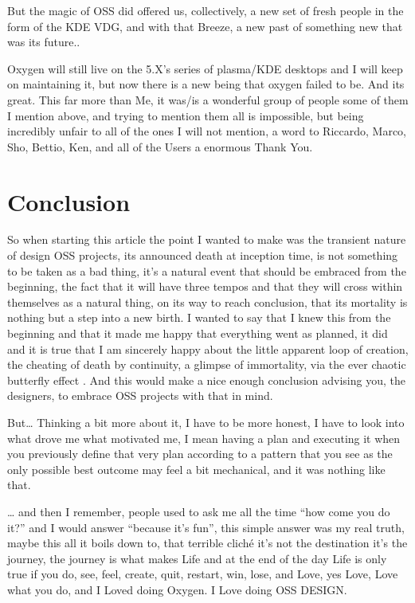 But the magic of OSS did offered us, collectively, a new set of fresh people in the form of the KDE VDG, and with that Breeze, a new past of something new that was its future..

Oxygen will still live on the 5.X's series of plasma/KDE desktops and I will keep on maintaining it, but now there is a new being that oxygen failed to be. And its great.
This far more than Me, it was/is a wonderful group of people some of them I mention above, and trying to mention them all is impossible, but being incredibly unfair to all of the ones I will not mention, a word to Riccardo, Marco, Sho, Bettio, Ken, and all of the Users a enormous Thank You. 

\section*{Conclusion}
So when starting this article the point I wanted to make was the transient nature of design OSS projects, its announced death at inception time, is not something to be taken as a bad thing, it's a natural event that should be embraced from the beginning, the fact that it will have three tempos and that they will cross within themselves as a natural thing, on its way to reach conclusion, that its mortality is nothing but a step into a new birth.
I wanted to say that I knew this from the beginning and that it made me happy that everything went as planned, it did and it is true that I am sincerely happy about the little apparent loop of creation, the cheating of death by continuity, a glimpse of immortality, via the ever chaotic butterfly effect . And this would make a nice enough conclusion advising you, the designers, to embrace OSS projects with that in mind.

But… Thinking a bit more about it, I have to be more honest, I have to look into what drove me what motivated me, I mean having a plan and executing it when you previously define that very plan according to a pattern that you see as the only possible best outcome may feel a bit mechanical, and it was nothing like that.

… and then I remember, people used to ask me all the time “how come you do it?” and I would answer “because it's fun”, this simple answer was my real truth, maybe this all it boils down to, that terrible cliché it's not the destination it's the journey, the journey is what makes Life and at the end of the day Life is only true if you do, see, feel, create, quit, restart, win, lose, and Love, yes Love, Love what you do, and I Loved doing Oxygen. I Love doing OSS DESIGN. 

